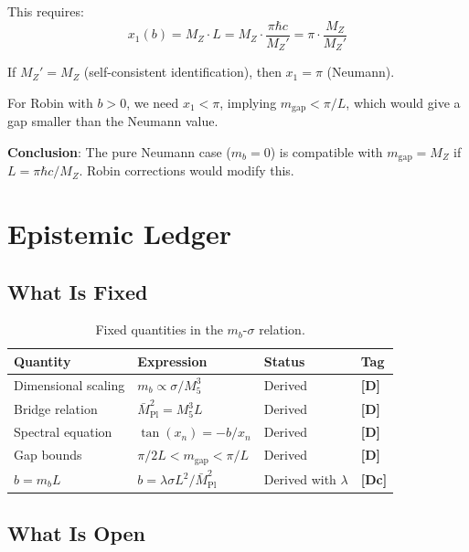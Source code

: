 \documentclass[11pt,a4paper]{article}
\newcommand{\Mpl}{\bar{M}_{\mathrm{Pl}}}
\newcommand{\Mfive}{M_5}
\newcommand{\mgap}{m_{\mathrm{gap}}}
\newcommand{\mb}{m_b}
\newcommand{\MZ}{M_Z}
\newcommand{\tagD}{\textbf{[D]}}
\newcommand{\tagDc}{\textbf{[Dc]}}
\theoremstyle{definition}
\theoremstyle{plain}
\theoremstyle{remark}
\begin{document}
This requires:
\begin{equation}
x_1(b) = \MZ \cdot L = \MZ \cdot \frac{\pi\hbar c}{\MZ'} = \pi \cdot \frac{\MZ}{\MZ'}
\label{eq:matching-2}
\end{equation}

If $\MZ' = \MZ$ (self-consistent identification), then $x_1 = \pi$ (Neumann).

For Robin with $b > 0$, we need $x_1 < \pi$, implying $\mgap < \pi/L$,
which would give a gap smaller than the Neumann value.

\textbf{Conclusion}: The pure Neumann case ($\mb = 0$) is compatible with
$\mgap = \MZ$ if $L = \pi\hbar c/\MZ$. Robin corrections would modify this.

\section{Epistemic Ledger}
\label{sec:ledger}

\subsection{What Is Fixed}

\begin{table}[htbp]
\centering
\caption{Fixed quantities in the $\mb$-$\sigma$ relation.}
\label{tab:fixed}
\begin{tabular}{@{}llll@{}}
\toprule
Quantity & Expression & Status & Tag \\
\midrule
Dimensional scaling & $\mb \propto \sigma/\Mfive^3$ & Derived & \tagD{} \\
Bridge relation & $\Mpl^2 = \Mfive^3 L$ & Derived & \tagD{} \\
Spectral equation & $\tan(x_n) = -b/x_n$ & Derived & \tagD{} \\
Gap bounds & $\pi/2L < \mgap < \pi/L$ & Derived & \tagD{} \\
$b = \mb L$ & $b = \lambda\sigma L^2/\Mpl^2$ & Derived with $\lambda$ & \tagDc{} \\
\bottomrule
\end{tabular}
\end{table}

\subsection{What Is Open}
\end{document}
